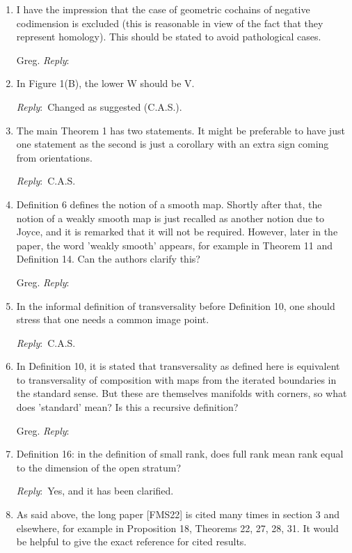 \documentclass{amsart}
\newcommand{\ar}{\medskip\noindent\textit{Reply}:\ }
\newcommand{\tbw}{\ar \hrulefill}
\newcommand{\cas}{\ar C.A.S.}
\begin{document}
\begin{enumerate}
	\item I have the impression that the case of geometric cochains of negative codimension is excluded (this is reasonable in view of the fact that they represent homology). This should be stated to avoid pathological cases.

	Greg. \tbw

	\item In Figure 1(B), the lower W should be V.

	\ar Changed as suggested (C.A.S.).

	\item The main Theorem 1 has two statements. It might be preferable to have just one statement as the second is just a corollary with an extra sign coming from orientations.

	\cas

	\item Definition 6 defines the notion of a smooth map. Shortly after that, the notion of a weakly smooth map is just recalled as another notion due to Joyce, and it is remarked that it will not be required. However, later in the paper, the word 'weakly smooth' appears, for example in Theorem 11 and Definition 14. Can the authors clarify this?

	Greg. \tbw

	\item In the informal definition of transversality before Definition 10, one should stress that one needs a common image point.

	\cas

	\item In Definition 10, it is stated that transversality as defined here is equivalent to transversality of composition with maps from the iterated boundaries in the standard sense. But these are themselves manifolds with corners, so what does 'standard' mean? Is this a recursive definition?

	Greg. \tbw

	\item Definition 16: in the definition of small rank, does full rank mean rank equal to the dimension of the open stratum?

	\ar Yes, and it has been clarified.

	\item As said above, the long paper [FMS22] is cited many times in section 3 and elsewhere, for example in Proposition 18, Theorems 22, 27, 28, 31. It would be helpful to give the exact reference for cited results.


\end{enumerate}
\end{document}
